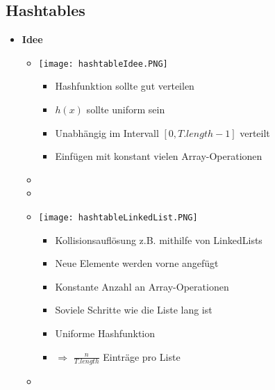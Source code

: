 \subsection{Hashtables}
    \begin{itemize}
        \item \textbf{Idee}
            \begin{itemize}
                \item[]
                    \begin{minipage}{0.4\textwidth}
                        \texttt{[image: hashtableIdee.PNG]}
                    \end{minipage}
                    \begin{minipage}{0.5\textwidth}
                        \begin{itemize}
                            \item Hashfunktion sollte gut verteilen
                            \item $h(x)$ sollte uniform sein
                            \item Unabhängig im Intervall $[0, T.length-1]$ verteilt
                            \item Einfügen mit konstant vielen Array-Operationen
                        \end{itemize}
                    \end{minipage}
                \item[]
                \item[]
                \item[]
                    \begin{minipage}{0.4\textwidth}
                        \texttt{[image: hashtableLinkedList.PNG]}
                    \end{minipage}
                    \begin{minipage}{0.5\textwidth}
                        \begin{itemize}
                            \item Kollisionsauflösung z.B. mithilfe von LinkedLists
                            \item Neue Elemente werden vorne angefügt
                            \item Konstante Anzahl an Array-Operationen
                            \item Soviele Schritte wie die Liste lang ist 
                            \item Uniforme Hashfunktion
                            \item[] $\Rightarrow$ $\frac{n}{T.length}$ Einträge pro Liste
                        \end{itemize}
                    \end{minipage}
                \item[]
            \end{itemize}


\end{itemize}
